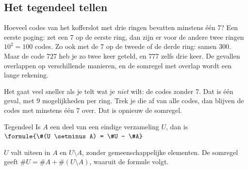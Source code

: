 
\begin{oefeningen}
\end{oefeningen}

\subsection{Het tegendeel tellen}

Hoeveel codes van het kofferslot met drie ringen bevatten minstens één 7? Een eerste poging: zet een 7 op de eerste ring, dan zijn er voor de andere twee ringen $10^2 = 100$ codes. Zo ook met de 7 op de tweede of de derde ring: samen $300$. Maar de code 727 heb je zo twee keer geteld, en 777 zelfs drie keer. De gevallen overlappen op verschillende manieren, en de somregel met overlap wordt een lange rekening.

Het gaat veel sneller als je telt wat je \textit{niet} wilt: de codes zonder 7. Dat is één geval, met 9 mogelijkheden per ring. Trek je die af van alle codes, dan blijven de codes met minstens één 7 over. Dat is opnieuw de somregel.

\begin{theorie}
\begin{stelling}{Tegendeel}
Is $A$ een deel van een eindige verzameling $U$, dan is \quad $\formule{\#(U \setminus A) = \#U - \#A}$
\end{stelling}

\begin{bewijs}
$U$ valt uiteen in $A$ en $U \setminus A$, zonder gemeenschappelijke elementen. De somregel geeft $\#U = \#A + \#(U \setminus A)$, waaruit de formule volgt.
\end{bewijs}
\end{theorie}


